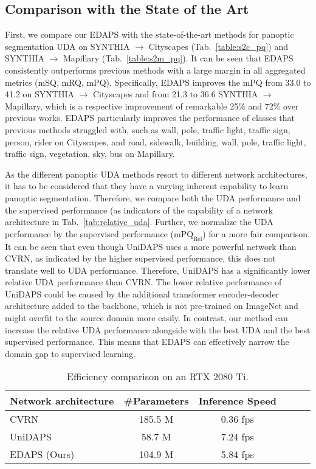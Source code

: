 \documentclass[10pt,twocolumn,letterpaper]{article}
\begin{document}
\subsection{Comparison with the State of the Art}

First, we compare our EDAPS with the state-of-the-art methods for panoptic segmentation UDA on SYNTHIA $\rightarrow$ Cityscapes (Tab.~\ref{table:s2c_pq}) and SYNTHIA $\rightarrow$ Mapillary (Tab.~\ref{table:s2m_pq}). It can be seen that EDAPS consistently outperforms previous methods with a large margin in all aggregated metrics (mSQ, mRQ, mPQ). Specifically, EDAPS improves the mPQ from 33.0 to 41.2 on SYNTHIA $\rightarrow$ Cityscapes and from 21.3 to 36.6 SYNTHIA $\rightarrow$ Mapillary, which is a respective improvement of remarkable 25\% and 72\% over previous works. 
EDAPS particularly improves the performance of classes that previous methods struggled with, such as wall, pole, traffic light, traffic sign, person, rider on Cityscapes, and road, sidewalk, building, wall, pole, traffic light, traffic sign, vegetation, sky, bus on Mapillary.

As the different panoptic UDA methods resort to different network architectures, it has to be considered that they have a varying inherent capability to learn panoptic segmentation. Therefore, we compare both the UDA performance and the supervised performance (as indicators of the capability of a network architecture in Tab.~\ref{tab:relative_uda}. Further, we normalize the UDA performance by the supervised performance ($\text{mPQ}_\text{Rel}$) for a more fair comparison. 
It can be seen that even though UniDAPS uses a more powerful network than CVRN, as indicated by the higher supervised performance, this does not translate well to UDA performance. Therefore, UniDAPS has a significantly lower relative UDA performance than CVRN. The lower relative performance of UniDAPS could be caused by the additional transformer encoder-decoder architecture added to the backbone, which is not pre-trained on ImageNet and might overfit to the source domain more easily.
In contrast, our method can increase the relative UDA performance alongside with the best UDA and the best supervised performance. This means that EDAPS can effectively narrow the domain gap to supervised learning.

\begingroup
\setlength{\tabcolsep}{3.5pt} 
\renewcommand{\arraystretch}{1.3}
\begin{table}
\centering
\caption{
Efficiency comparison on an RTX 2080 Ti.
}
\footnotesize
\begin{tabular}{l @{\quad} ccccc}

\toprule 

Network architecture & \#Parameters & Inference Speed  \\
\midrule
CVRN~\cite{huang2021cross}                  & 185.5 M   & 0.36 fps \\
UniDAPS~\cite{zhang2022hierarchical}        & 58.7 M    & 7.24 fps \\
EDAPS (Ours)                                & 104.9 M   & 5.84 fps \\
\bottomrule
\end{tabular} \label{tab:efficiency}
\end{table}
\endgroup
\end{document}

